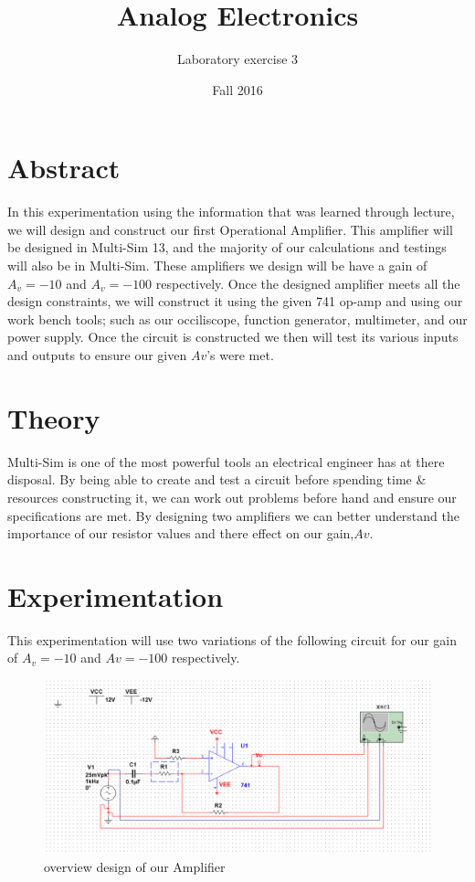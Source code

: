 \documentclass[12pt]{article}
\begin{document}
\title{Analog Electronics}
\author{Laboratory exercise 3}
\date{Fall 2016}
\maketitle

\newpage
\section{Abstract}

In this experimentation using the information that was learned through lecture, we will design and construct our first Operational Amplifier. This amplifier will be designed in Multi-Sim 13, and the majority of our calculations and testings will also be in Multi-Sim. These amplifiers we design will be have a gain of $A_v=-10$ and $A_v=-100$ respectively. Once the designed amplifier meets all the design constraints, we will construct it using the given 741 op-amp and using our work bench tools; such as our occiliscope, function generator, multimeter, and our power supply. Once the circuit is constructed we then will test its various inputs and outputs to ensure our given $Av$'s were met.

\section{Theory}

Multi-Sim is one of the most powerful tools an electrical engineer has at there disposal. By being able to create and test a circuit before spending time \& resources constructing it, we can work out problems before hand and ensure our specifications are met. By designing two amplifiers we can better understand the importance of our resistor values and there effect on our gain,$Av$.

\newpage

\section{Experimentation}




This experimentation will use two variations of the following circuit for our gain of $A_v=-10$ and $Av=-100$ respectively.

\begin{figure}[h]
	\label{amp}
	\caption{overview design of our Amplifier}
	\centering
	\includegraphics[width=1\textwidth]{amp}
\end{figure}
\end{document}

